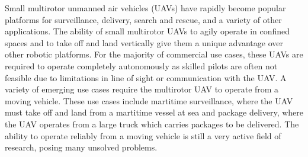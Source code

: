 
Small multirotor unmanned air vehicles (UAVs) have rapidly become popular platforms for
surveillance, delivery, search and rescue, and a variety of other applications.
The ability of small multirotor UAVs to agily operate in confined spaces and to
take off and land vertically give them a unique advantage over other robotic
platforms. For the majority of commercial use cases, these UAVs are required to operate
completely autonomously as skilled pilots are often not feasible due to
limitations in line of sight or communication with the UAV. 
A variety of emerging use cases
require the multirotor UAV to operate from a moving vehicle. These use
cases include martitime surveillance, where the UAV must take off and land from
a martitime vessel at sea
and package delivery, where the UAV operates from a large truck
which carries packages to be delivered. The ability to operate reliably from a
moving vehicle is still a very active field of research, posing many unsolved
problems.



